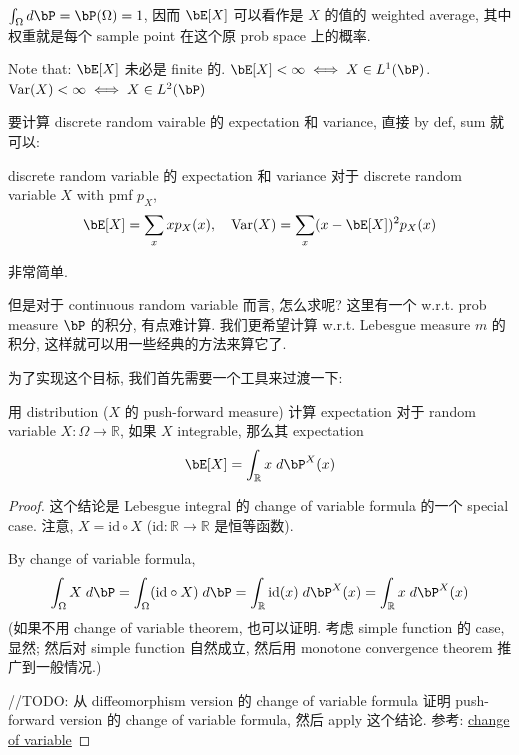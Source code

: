 \begin{remark}
    \(\int_{\Omega} d\bP = \bP(\Omega) =  1\), 因而
     \(\bE[X]\) 可以看作是 \(X\) 的值的 weighted average, 
     其中权重就是每个 sample point 在这个原 prob space 上的概率.

     Note that: \(\bE[X]\) 未必是 finite 的. \(\bE[X] < \infty \iff X \in L^1(\bP)\). 
     \(\text{Var}(X) < \infty \iff X \in L^2(\bP)\)
\end{remark}
要计算 discrete random vairable 的 expectation 和 variance, 直接 by def, sum 就可以:
\begin{proposition}{discrete random variable 的 expectation 和 variance}\label{discrete random variable 的 expectation 和 variance}
    对于 discrete random variable \(X\) with pmf \(p_X\), 
    \[
    \bE[X] = \sum_{x} x p_X(x), \quad \text{Var}(X) = \sum_{x} (x-\bE[X])^2 p_X(x)
    \]
\end{proposition}
非常简单. 

但是对于 continuous random variable 而言, 怎么求呢? 这里有一个 w.r.t. prob measure \(\bP\) 的积分, 
有点难计算. 我们更希望计算 w.r.t. Lebesgue measure \(m\) 的积分,
这样就可以用一些经典的方法来算它了.

为了实现这个目标, 我们首先需要一个工具来过渡一下:

\begin{lemma}{用 distribution (\(X\) 的 push-forward measure) 计算 expectation}\label{用 distribution 计算 expectation}
    对于 random variable \(X: \Omega \to \mathbb{R}\), 如果 \(X\) integrable, 那么其 expectation
    \[
    \bE[X] = \int_{\mathbb{R}} x \;d\bP^X(x)
    \]
\end{lemma}
\begin{proof}
    这个结论是 Lebesgue integral 的 change of variable formula 的一个 special case.
    注意, \(X = \text{id} \circ X\) (\(\text{id}: \mathbb{R} \to \mathbb{R}\) 是恒等函数).

    By change of variable formula,
    \[
    \int_\Omega X \;d\bP = \int_\Omega (\text{id} \circ X) \;d\bP = \int_{\mathbb{R}} \text{id}(x) \;d\bP^X(x) = \int_{\mathbb{R}} x \;d\bP^X(x)
    \]
    (如果不用 change of variable theorem, 也可以证明. 考虑 simple function 的 case, 显然;
    然后对 simple function 自然成立, 然后用 monotone convergence theorem 推广到一般情况.)

    //TODO: 从 diffeomorphism version 的 change of variable formula 证明 push-forward version 
    的 change of variable formula, 然后 apply 这个结论.
    参考: \href{https://en.wikipedia.org/wiki/Change_of_variables}{change of variable}
\end{proof}




